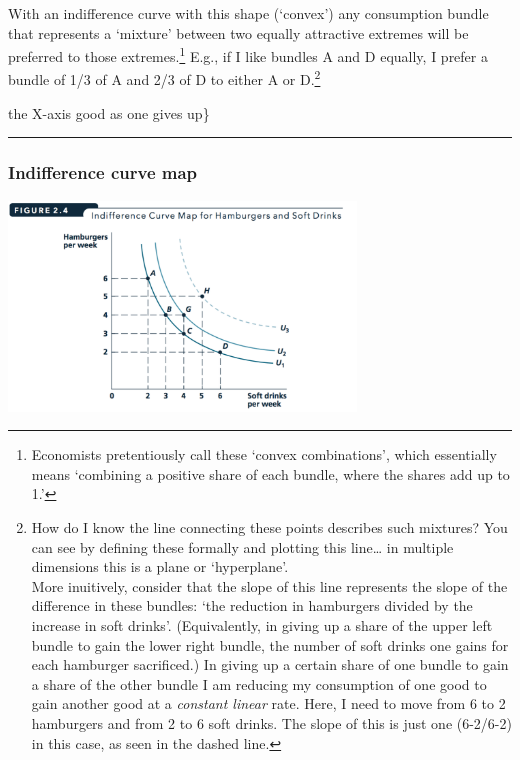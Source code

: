 \documentclass[]{article}
\begin{document}
With an indifference curve with this shape (`convex') any consumption
bundle that represents a `mixture' between two equally attractive
extremes will be preferred to those extremes.\footnote{Economists
  pretentiously call these `convex combinations', which essentially
  means `combining a positive share of each bundle, where the shares add
  up to 1.'} E.g., if I like bundles A and D equally, I prefer a bundle
of 1/3 of A and 2/3 of D to either A or D.\footnote{How do I know the
  line connecting these points describes such mixtures? You can see by
  defining these formally and plotting this line\ldots{} in multiple
  dimensions this is a plane or `hyperplane'.\\
  More inuitively, consider that the slope of this line represents the
  slope of the difference in these bundles: `the reduction in hamburgers
  divided by the increase in soft drinks'. (Equivalently, in giving up a
  share of the upper left bundle to gain the lower right bundle, the
  number of soft drinks one gains for each hamburger sacrificed.) In
  giving up a certain share of one bundle to gain a share of the other
  bundle I am reducing my consumption of one good to gain another good
  at a \emph{constant linear} rate. Here, I need to move from 6 to 2
  hamburgers and from 2 to 6 soft drinks. The slope of this is just one
  (6-2/6-2) in this case, as seen in the dashed line.}

the X-axis good as one gives up\}

\begin{center}\rule{0.5\linewidth}{\linethickness}\end{center}

\hypertarget{indifference-curve-map}{%
\subsubsection{Indifference curve map}\label{indifference-curve-map}}

\includegraphics[height=2.2in]{picsfigs/indifcurvemap.png}
\end{document}
